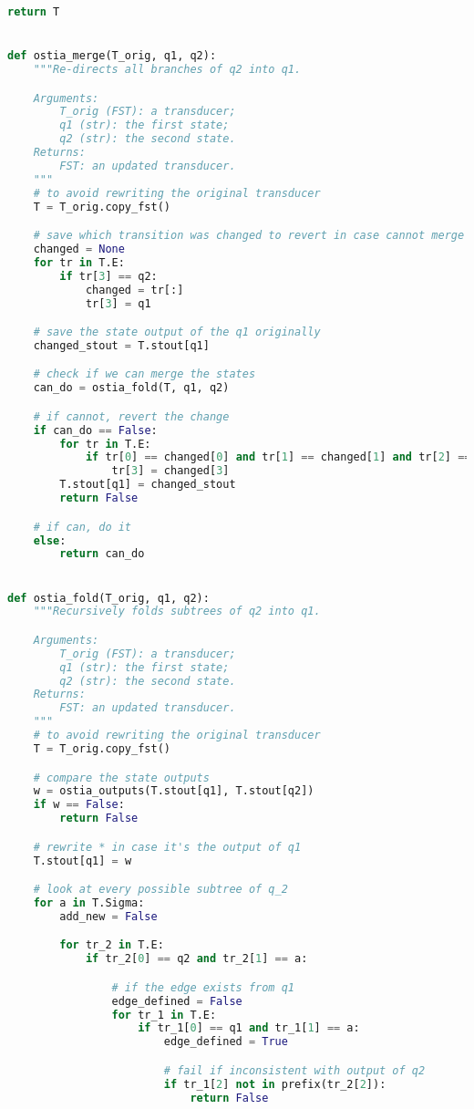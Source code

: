 \begin{lstlisting}[language=Python]
    return T


def ostia_merge(T_orig, q1, q2):
    """Re-directs all branches of q2 into q1.

    Arguments:
        T_orig (FST): a transducer;
        q1 (str): the first state;
        q2 (str): the second state.
    Returns:
        FST: an updated transducer.
    """
    # to avoid rewriting the original transducer
    T = T_orig.copy_fst()

    # save which transition was changed to revert in case cannot merge the states
    changed = None
    for tr in T.E:
        if tr[3] == q2:
            changed = tr[:]
            tr[3] = q1

    # save the state output of the q1 originally
    changed_stout = T.stout[q1]

    # check if we can merge the states
    can_do = ostia_fold(T, q1, q2)

    # if cannot, revert the change
    if can_do == False:
        for tr in T.E:
            if tr[0] == changed[0] and tr[1] == changed[1] and tr[2] == changed[2]:
                tr[3] = changed[3]
        T.stout[q1] = changed_stout
        return False

    # if can, do it
    else:
        return can_do


def ostia_fold(T_orig, q1, q2):
    """Recursively folds subtrees of q2 into q1.

    Arguments:
        T_orig (FST): a transducer;
        q1 (str): the first state;
        q2 (str): the second state.
    Returns:
        FST: an updated transducer.
    """
    # to avoid rewriting the original transducer
    T = T_orig.copy_fst()

    # compare the state outputs
    w = ostia_outputs(T.stout[q1], T.stout[q2])
    if w == False:
        return False

    # rewrite * in case it's the output of q1
    T.stout[q1] = w

    # look at every possible subtree of q_2
    for a in T.Sigma:
        add_new = False

        for tr_2 in T.E:
            if tr_2[0] == q2 and tr_2[1] == a:

                # if the edge exists from q1
                edge_defined = False
                for tr_1 in T.E:
                    if tr_1[0] == q1 and tr_1[1] == a:
                        edge_defined = True

                        # fail if inconsistent with output of q2
                        if tr_1[2] not in prefix(tr_2[2]):
                            return False


\end{lstlisting}
